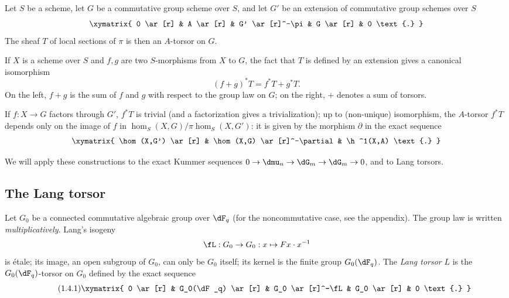 \subsection{}\label{VI:1-3}

Let $S$ be a scheme, let $G$ be a commutative group scheme over $S$, and let $G'$ 
be an extension of commutative group schemes over $S$
\[\xymatrix{
  0 \ar[r] 
    & A \ar[r] 
    & G' \ar[r]^-\pi 
    & G \ar[r] 
    & 0 \text{.}
}\]
The sheaf $T$ of local sections of $\pi$ is then an $A$-torsor on 
$G$. 

If $X$ is a scheme over $S$ and $f,g$ are two $S$-morphisms from $X$ to $G$, 
the fact that $T$ is defined by an extension gives a canonical isomorphism 
\begin{equation*}\tag{1.3.1}\label{VI:eq:1-3-1}
  (f+g)^\ast T = f^\ast T + g^\ast T \text{.}
\end{equation*}
On the left, $f+g$ is the sum of $f$ and $g$ with respect to the group law on $G$; 
on the right, $+$ denotes a sum of torsors. 

If $f:X\to G$ factors through $G'$, $f^\ast T$ is trivial (and a 
factorization gives a trivialization); up to (non-unique) isomorphism, 
the $A$-torsor $f^\ast T$ depends only on the image of $f$ in 
$\hom_S(X,G)/\pi\hom_S(X,G')$: it is given by the morphism $\partial$ in 
the exact sequence 
\[\xymatrix{
  \hom(X,G') \ar[r] 
    & \hom(X,G) \ar[r]^-\partial 
    & \h^1(X,A) \text{.}
}\]

We will apply these constructions to the exact Kummer sequences 
$0 \to \dmu_n \to \dG_m \to \dG_m \to 0$, and to Lang torsors. 





\subsection{The Lang torsor}\label{VI:1-4}

Let $G_0$ be a connected commutative algebraic group over $\dF_q$ (for the 
noncommutative case, see the appendix). The group law is written 
\emph{multiplicatively}. Lang's isogeny 
\[
\fL:G_0 \to G_0: x\mapsto F x\cdot x^{-1}
\]
is étale; its image, an open subgroup of $G_0$, can only be 
$G_0$ itself; its kernel is the finite group $G_0(\dF_q)$. The \emph{Lang 
torsor} $L$ is the $G_0(\dF_q)$-torsor on $G_0$ defined by the exact sequence 
\begin{equation*}\tag{1.4.1}\label{VI:eq:1-4-1}
\xymatrix{
  0 \ar[r] 
    & G_0(\dF_q) \ar[r] 
    & G_0 \ar[r]^-\fL 
    & G_0 \ar[r] 
    & 0 \text{.}
}
\end{equation*}

